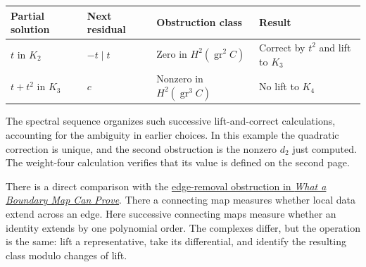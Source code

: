 \documentclass[11pt,letterpaper]{article}
\begin{document}
\begin{center}\begingroup\small\setlength{\tabcolsep}{5pt}\renewcommand{\arraystretch}{1.2}
\begin{tabularx}{\linewidth}{@{}>{\raggedright\arraybackslash}X>{\raggedright\arraybackslash}X>{\raggedright\arraybackslash}X>{\raggedright\arraybackslash}X@{}}
\toprule
\textbf{Partial solution} & \textbf{Next residual} & \textbf{Obstruction class} & \textbf{Result} \\
\midrule
\(
t
\) in \(
K_2
\) & \(
-t\mid t
\) & Zero in \(
H^2(\operatorname{gr}^2 C)
\) & Correct by \(
t^2
\) and lift to \(
K_3
\) \\
\(
t+t^2
\) in \(
K_3
\) & \(
c
\) & Nonzero in \(
H^2(\operatorname{gr}^3 C)
\) & No lift to \(
K_4
\) \\
\bottomrule
\end{tabularx}\endgroup\end{center}

The spectral sequence organizes such successive lift-and-correct calculations, accounting for the ambiguity in earlier choices. In this example the quadratic correction is unique, and the second obstruction is the nonzero \(
d_2
\) just computed. The weight-four calculation verifies that its value is defined on the second page.


There is a direct comparison with the \href{https://tensorgami.com/notes/what-a-boundary-map-can-prove.html\#removing-an-edge-produces-an-obstruction-map}{edge-removal obstruction in \emph{What a Boundary Map Can Prove}}. There a connecting map measures whether local data extend across an edge. Here successive connecting maps measure whether an identity extends by one polynomial order. The complexes differ, but the operation is the same: lift a representative, take its differential, and identify the resulting class modulo changes of lift.
\end{document}

